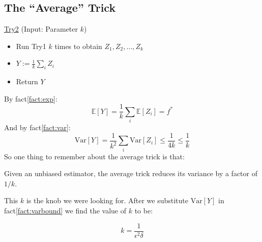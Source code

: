 \documentclass[11pt]{article}
\newcommand{\Ex}{\mathbb{E}}
\newcommand{\Var}{\text{Var}}
\begin{document}
\subsection{The ``Average'' Trick}
\begin{mdframed}[backgroundcolor=blue!05,topline=false,bottomline=false,leftline=false,rightline=false] 
	\underline{\sc Try2}
	(Input: Parameter $k$)
	\begin{itemize}
	
		\item Run Try1 $k$ times to obtain $Z_1,Z_2,\dots,Z_k$
		\item $ Y := \frac{1}{k}\sum_i Z_i$
		\item Return $Y$
	\end{itemize}
\end{mdframed}
By fact\eqref{fact:exp}:
\begin{equation*}
    \Ex[Y] = \frac{1}{k}\sum_i \Ex[Z_i] = f^*
\end{equation*}
And by fact\eqref{fact:var}:
\begin{equation*}
    \Var[Y] = \frac{1}{k^2}\sum_i \Var[Z_i] \leq \frac{1}{4k} \leq \frac{1}{k}
\end{equation*}
So one thing to remember about the average trick is that:

\begin{mdframed}[backgroundcolor=yellow!10,topline=false,bottomline=false,leftline=false,rightline=false] 
		Given an unbiased estimator, the average trick reduces its variance by a factor of $1/k$.
\end{mdframed}

This $k$ is the knob we were looking for. After we substitute $\Var[Y]$ in fact\eqref{fact:varbound} we find the value of $k$ to be:
\begin{mdframed}[backgroundcolor=yellow!10,topline=false,bottomline=false,leftline=false,rightline=false] 
\begin{equation*}
    k = \frac{1}{\epsilon^2\delta}
\end{equation*}
\end{mdframed}
\end{document}
